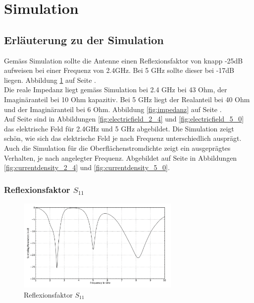 \newpage
\section{Simulation}

\subsection{Erläuterung zu der Simulation}
Gemäss Simulation sollte die Antenne einen Reflexionsfaktor von knapp -25dB aufweisen bei einer Frequenz von 2.4GHz. Bei 5 GHz sollte dieser bei -17dB liegen. Abbildung \ref{fig:reflexionsfaktor} auf Seite \pageref{fig:reflexionsfaktor}.\\
Die reale Impedanz liegt gemäss Simulation bei 2.4 GHz bei 43 Ohm, der Imaginäranteil bei 10 Ohm kapazitiv. Bei 5 GHz liegt der Realanteil bei 40 Ohm und der Imaginäranteil bei 6 Ohm. Abbildung \ref{fig:impedanz} auf Seite \pageref{fig:impedanz}.\\
Auf Seite \pageref{fig:electricfield} sind in Abbildungen \ref{fig:electricfield_2_4} und \ref{fig:electricfield_5_0} das elektrische Feld für 2.4GHz und 5 GHz abgebildet. Die Simulation zeigt schön, wie sich das elektrische Feld je nach Frequenz unterschiedlich ausprägt.\\
Auch die Simulation für die Oberflächenstromdichte zeigt ein ausgeprägtes Verhalten, je nach angelegter Frequenz. Abgebildet auf Seite \pageref{fig:currentdensity} in Abbildungen \ref{fig:currentdensity_2_4} und \ref{fig:currentdensity_5_0}.


\clearpage
\subsubsection{Reflexionsfaktor $S_{11}$}
\begin{figure}[h!]
	\centering
	\includegraphics[width=0.7\textwidth]{../fig/plt/crazy_stuff_l4_pcb_v2c_laptop_1a_105_S11_2.png}
	\caption{Reflexionsfaktor $S_{11}$}
	\label{fig:reflexionsfaktor}
\end{figure}

